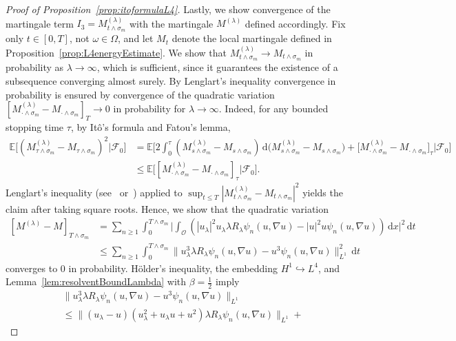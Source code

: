 \documentclass[reqno]{amsart}
\newcommand{\E}{\mathbb{E}}
\newcommand{\F}{\mathscr{F}}
\newcommand{\sO}{\mathscr{O}}
\newcommand{\hra}{\hookrightarrow}
\newcommand{\1}{\mathbf{1}}
\newcommand{\grad}{\nabla}
\newcommand{\dt}{\,\mathrm{d}t}
\newcommand{\dx}{\,\mathrm{d}x}
\newcommand{\dd}{\ensuremath{\mathrm{d}}}
\newcommand{\yosi}{\lambda R_\lambda}
\begin{document}
\begin{proof}[Proof of Proposition~\ref{prop:itoformulaL4}]
Lastly, we show convergence of the martingale term $I_3=M^{(\lambda)}_{t \land \sigma_m}$ with the martingale $M^{(\lambda)}$ defined accordingly.
Fix only $t\in [0,T]$, not $\omega\in\Omega$, and let  $M_t$ denote the local martingale defined in Proposition~\ref{prop:L4energyEstimate}.
We show that $M^{(\lambda)}_{t \land \sigma_m} \to M_{t \land \sigma_m}$ in probability as $\lambda \to \infty$, which is sufficient, since it guarantees the existence of a subsequence converging almost surely.
By Lenglart's inequality convergence in probability is ensured by convergence of the quadratic variation $[M^{(\lambda)}_{\cdot \wedge\sigma_m} - M_{\cdot \wedge\sigma_m}]_{T}\to 0$ in probability for $\lambda \to \infty$. Indeed, for any bounded stopping time $\tau$, by Itô's formula and Fatou's lemma, 
\begin{align*}
    \E\big[(M^{(\lambda)}_{\tau \wedge\sigma_m} - M_{\tau\wedge\sigma_m})^2 \big| \F_0 \big]
    &= \E\Big[ 2\int_0^\tau (M^{(\lambda)}_{s\wedge\sigma_m} - M_{s \wedge\sigma_m})\,\dd \big(M^{(\lambda)}_{s\wedge\sigma_m} - M_{s \wedge\sigma_m}\big)  + \big[M^{(\lambda)}_{\cdot \wedge\sigma_m} - M_{\cdot \wedge\sigma_m}\big]_{\tau} \Big| \F_0\Big] \\
    &\le  \E\big[ [M^{(\lambda)}_{\cdot \wedge\sigma_m} - M_{\cdot \wedge\sigma_m}]_{\tau} \big| \F_0\big].
\end{align*}
Lenglart's inequality (see~\cite[Th\'eor\`eme I]{Lenglart} or~\cite[Lemma 2.2.]{MehriScheutzow})   applied to $\sup_{t\le T} |M^{(\lambda)}_{t \land \sigma_m}-M_{t \land \sigma_m}|^2$ yields the claim after taking square roots. Hence, we show that the quadratic variation
\begin{align}
\label{eq:quadraticVariationM1InProof}
    [M^{(\lambda)} - M]_{T
    \wedge \sigma_m} & = \sum_{n \geq 1} \int_0^{T
    \wedge \sigma_m} \Big| \int_{\sO} \left(|u_\lambda|^2 u_\lambda  \lambda R_\lambda \psi_n(u,\grad u)   - |u|^2 u \psi_n(u,\grad u) \right) \dx \Big|^2 \dt   \nonumber\\
    &\le\sum_{n \geq 1} \int_0^{T
    \wedge \sigma_m}    \|u_\lambda^3\lambda R_\lambda\psi_n(u,\grad u) - u^3 \psi_n(u,\grad u) \|_{L^1}^2\dt
\end{align}
converges to $0$ in probability. Hölder's inequality, the embedding $H^1\hra L^4$, and Lemma~\ref{lem:resolventBoundLambda} with $\beta=\frac{1}{2}$ imply
\begin{align*}
    &\|u_\lambda^3\yosi\psi_n(u,\grad u)-u^3\psi_n(u,\grad u)\|_{L^1}\\
    &\le 
    \|(u_\lambda-u)(u_\lambda^2+u_\lambda u+u^2)\yosi\psi_n(u,\grad u)\|_{L^1}+

\end{align*}
\end{proof}
\end{document}
